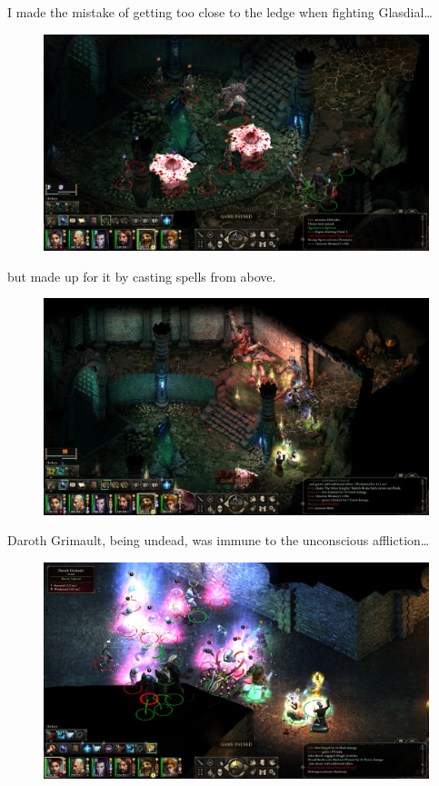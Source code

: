 \documentclass{article}
\begin{document}
I made the mistake of getting too close to the ledge when fighting Glasdial\ldots

\begin{figure}
\includegraphics[scale=0.33]{files/blog/2019_03_04_pillars_of_eternity_path_of_the_damned_act_iii/2019_03_04_glasdial1.jpg}
\end{figure}

but made up for it by casting spells from above.

\begin{figure}
\includegraphics[scale=0.33]{files/blog/2019_03_04_pillars_of_eternity_path_of_the_damned_act_iii/2019_03_04_glasdial2.jpg}
\end{figure}

Daroth Grimault, being undead, was immune to the unconscious affliction\ldots

\begin{figure}
\includegraphics[scale=0.33]{files/blog/2019_03_04_pillars_of_eternity_path_of_the_damned_act_iii/2019_03_04_daroth_grimault1.jpg}
\end{figure}
\end{document}
